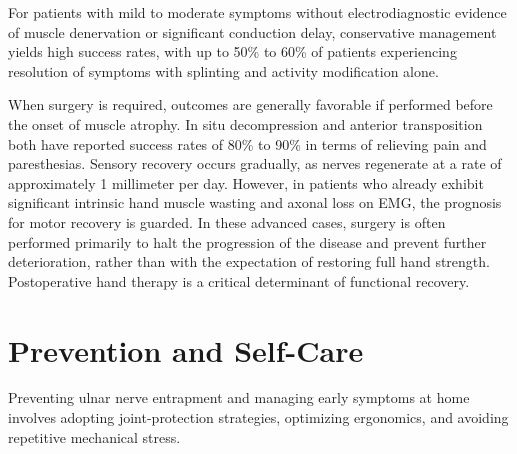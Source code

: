 For patients with mild to moderate symptoms without electrodiagnostic evidence of muscle denervation or significant conduction delay, conservative management yields high success rates, with up to 50\% to 60\% of patients experiencing resolution of symptoms with splinting and activity modification alone.

When surgery is required, outcomes are generally favorable if performed before the onset of muscle atrophy. In situ decompression and anterior transposition both have reported success rates of 80\% to 90\% in terms of relieving pain and paresthesias. Sensory recovery occurs gradually, as nerves regenerate at a rate of approximately 1 millimeter per day. However, in patients who already exhibit significant intrinsic hand muscle wasting and axonal loss on EMG, the prognosis for motor recovery is guarded. In these advanced cases, surgery is often performed primarily to halt the progression of the disease and prevent further deterioration, rather than with the expectation of restoring full hand strength. Postoperative hand therapy is a critical determinant of functional recovery.

\section*{Prevention and Self-Care}
Preventing ulnar nerve entrapment and managing early symptoms at home involves adopting joint-protection strategies, optimizing ergonomics, and avoiding repetitive mechanical stress.

